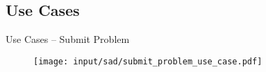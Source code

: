 \subsection{Use Cases}
\begin{frame}{Use Cases -- Submit Problem}

\begin{figure}[htbp]
	\begin{center}
	\texttt{[image: input/sad/submit\_problem\_use\_case.pdf]}
	\end{center}
\end{figure}

\end{frame}